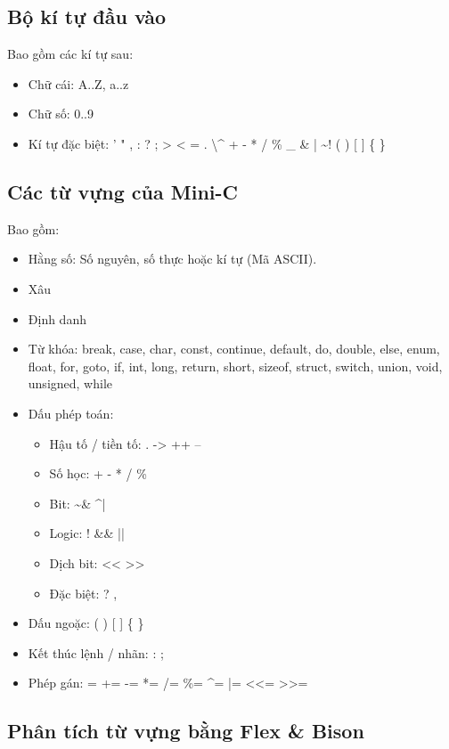 \documentclass[../report.tex]{subfiles}
\begin{document}
\subsection{Bộ kí tự đầu vào} 
Bao gồm các kí tự sau: 
\begin{itemize}
\item Chữ cái: A..Z, a..z
\item Chữ số: 0..9
\item Kí tự đặc biệt: ' " , : ? ; > < = . \textbackslash \textasciicircum 
            + - * / \% \_ \& | \textasciitilde ! ( ) [ ] \{ \}
\end{itemize}

\subsection{Các từ vựng của Mini-C}
Bao gồm:
\begin{itemize}
    \item Hằng số: Số nguyên, số thực hoặc kí tự (Mã ASCII).
    \item Xâu
    \item Định danh 
    \item Từ khóa: 
        break, case, char, const, continue, 
        default, do, double, else, enum, 
        float, for, goto, if, int, long, 
        return, short, sizeof, struct, switch, 
        union, void, unsigned, while
    \item Dấu phép toán:
    \begin{itemize}
        \item Hậu tố / tiền tố: . -> ++ --
        \item Số học: + - * / \% 
        \item Bit: \textasciitilde \& \textasciicircum | 
        \item Logic: ! \&\& || 
        \item Dịch bit: << >> 
        \item Đặc biệt: ? , 
    \end{itemize}
    \item Dấu ngoặc: ( ) [ ] \{ \}
    \item Kết thúc lệnh / nhãn: : ;
    \item Phép gán: 
        = += -= *= /= \%= \textasciicircum= |= <<= >>=
\end{itemize}
\subsection{Phân tích từ vựng bằng Flex \& Bison}
\end{document}

